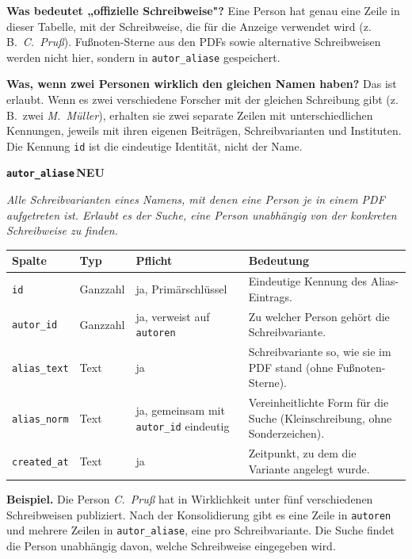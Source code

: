 \documentclass[11pt,a4paper,parskip=half-]{scrartcl}
\newcommand{\tabhead}[1]{\textsf{\textbf{\small\color{accent}#1}}}
\newcommand{\tagneu}{\colorbox{newtag!15}{\textcolor{newtag}{\sffamily\footnotesize\bfseries\,NEU\,}}}
\newcommand{\tabletitle}[2]{%
  \par\vspace{1.1em}%
  \noindent%
  \begin{tcolorbox}[
    enhanced,
    colback=tabletitlebg,
    colframe=tabletitlebg,
    arc=2pt,
    boxrule=0pt,
    left=10pt, right=10pt, top=4pt, bottom=4pt,
    before skip=0pt, after skip=6pt
  ]
    {\sffamily\large\bfseries\color{white}\texttt{#1}}\hfill{#2}
  \end{tcolorbox}%
  \par\nobreak%
}
\begin{document}
\begin{hinweis}
\textbf{Was bedeutet „offizielle Schreibweise"?} Eine Person hat
genau eine Zeile in dieser Tabelle, mit der Schreibweise, die für die
Anzeige verwendet wird (z.\,B.~\textit{C.~Pruß}). Fußnoten-Sterne aus den
PDFs sowie alternative Schreibweisen werden nicht hier, sondern in
\texttt{autor\_aliase} gespeichert.

\smallskip
\textbf{Was, wenn zwei Personen wirklich den gleichen Namen haben?}
Das ist erlaubt. Wenn es zwei verschiedene Forscher mit der gleichen
Schreibung gibt (z.\,B.~zwei \textit{M.~Müller}), erhalten sie zwei
separate Zeilen mit unterschiedlichen Kennungen, jeweils mit ihren
eigenen Beiträgen, Schreibvarianten und Instituten. Die Kennung
\texttt{id} ist die eindeutige Identität, nicht der Name.
\end{hinweis}

\tabletitle{autor\_aliase}{\tagneu}

\textit{Alle Schreibvarianten eines Namens, mit denen eine Person je in
einem PDF aufgetreten ist. Erlaubt es der Suche, eine Person unabhängig
von der konkreten Schreibweise zu finden.}

\begin{tabularx}{\linewidth}{L{3.6cm} L{1.9cm} L{3.0cm} X}
\toprule
\tabhead{Spalte} & \tabhead{Typ} & \tabhead{Pflicht} & \tabhead{Bedeutung} \\
\midrule
\texttt{id}          & Ganzzahl & ja, Primärschlüssel & Eindeutige Kennung des Alias-Eintrags. \\
\texttt{autor\_id}   & Ganzzahl & ja, verweist auf \texttt{autoren} & Zu welcher Person gehört die Schreibvariante. \\
\texttt{alias\_text} & Text     & ja & Schreibvariante so, wie sie im PDF stand (ohne Fußnoten-Sterne). \\
\texttt{alias\_norm} & Text     & ja, gemeinsam mit \texttt{autor\_id} eindeutig & Vereinheitlichte Form für die Suche (Kleinschreibung, ohne Sonderzeichen). \\
\texttt{created\_at} & Text     & ja & Zeitpunkt, zu dem die Variante angelegt wurde. \\
\bottomrule
\end{tabularx}

\begin{hinweis}
\textbf{Beispiel.} Die Person \textit{C.~Pruß} hat in Wirklichkeit unter
fünf verschiedenen Schreibweisen publiziert. Nach der Konsolidierung gibt
es eine Zeile in \texttt{autoren} und mehrere Zeilen in
\texttt{autor\_aliase}, eine pro Schreibvariante. Die Suche findet die
Person unabhängig davon, welche Schreibweise eingegeben wird.
\end{hinweis}
\end{document}
